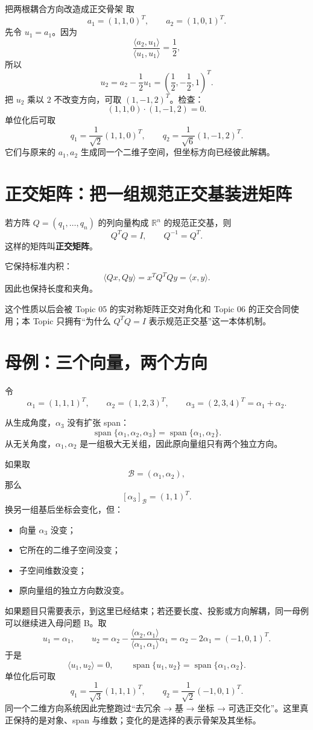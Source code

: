 \documentclass[11pt,a4paper]{ctexart}
\newcommand{\kw}[1]{\textbf{\color{deep}#1}}
\begin{document}
\begin{examplebox}{把两根耦合方向改造成正交骨架}
取
\[
a_1=(1,1,0)^T,\qquad a_2=(1,0,1)^T.
\]
先令 $u_1=a_1$。因为
\[
\frac{\langle a_2,u_1\rangle}{\langle u_1,u_1\rangle}
=\frac{1}{2},
\]
所以
\[
u_2=a_2-\frac12u_1
=\left(\frac12,-\frac12,1\right)^T.
\]
把 $u_2$ 乘以 $2$ 不改变方向，可取 $(1,-1,2)^T$。检查：
\[
(1,1,0)\cdot(1,-1,2)=0.
\]
单位化后可取
\[
q_1=\frac1{\sqrt2}(1,1,0)^T,
\qquad
q_2=\frac1{\sqrt6}(1,-1,2)^T.
\]
它们与原来的 $a_1,a_2$ 生成同一个二维子空间，但坐标方向已经彼此解耦。
\end{examplebox}

\section{正交矩阵：把一组规范正交基装进矩阵}

若方阵 $Q=(q_1,\dots,q_n)$ 的列向量构成 $\mathbb R^n$ 的规范正交基，则
\[
Q^TQ=I,
\qquad Q^{-1}=Q^T.
\]
这样的矩阵叫\kw{正交矩阵}。

它保持标准内积：
\[
\langle Qx,Qy\rangle=x^TQ^TQy=\langle x,y\rangle.
\]
因此也保持长度和夹角。

这个性质以后会被 Topic 05 的实对称矩阵正交对角化和 Topic 06 的正交合同使用；本 Topic 只拥有“为什么 $Q^TQ=I$ 表示规范正交基”这一本体机制。

\section{母例：三个向量，两个方向}

令
\[
\alpha_1=(1,1,1)^T,\qquad
\alpha_2=(1,2,3)^T,\qquad
\alpha_3=(2,3,4)^T=\alpha_1+\alpha_2.
\]

从生成角度，$\alpha_3$ 没有扩张 span：
\[
\operatorname{span}\{\alpha_1,\alpha_2,\alpha_3\}
=\operatorname{span}\{\alpha_1,\alpha_2\}.
\]
从无关角度，$\alpha_1,\alpha_2$ 是一组极大无关组，因此原向量组只有两个独立方向。

如果取
\[
\mathcal B=(\alpha_1,\alpha_2),
\]
那么
\[
[\alpha_3]_{\mathcal B}=(1,1)^T.
\]
换另一组基后坐标会变化，但：

\begin{itemize}
  \item 向量 $\alpha_3$ 没变；
  \item 它所在的二维子空间没变；
  \item 子空间维数没变；
  \item 原向量组的独立方向数没变。
\end{itemize}

如果题目只需要表示，到这里已经结束；若还要长度、投影或方向解耦，同一母例可以继续进入母问题 B。取
\[
u_1=\alpha_1,
\qquad
u_2=\alpha_2-
\frac{\langle\alpha_2,\alpha_1\rangle}{\langle\alpha_1,\alpha_1\rangle}\alpha_1
=\alpha_2-2\alpha_1=(-1,0,1)^T.
\]
于是
\[
\langle u_1,u_2\rangle=0,
\qquad
\operatorname{span}\{u_1,u_2\}
=\operatorname{span}\{\alpha_1,\alpha_2\}.
\]
单位化后可取
\[
q_1=\frac1{\sqrt3}(1,1,1)^T,
\qquad
q_2=\frac1{\sqrt2}(-1,0,1)^T.
\]
同一个二维方向系统因此完整跑过“去冗余 → 基 → 坐标 → 可选正交化”。这里真正保持的是对象、span 与维数；变化的是选择的表示骨架及其坐标。
\end{document}
